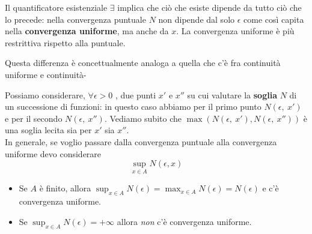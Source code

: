 Il quantificatore esistenziale $\exists$ implica che ciò che esiste dipende da tutto ciò che lo precede: nella convergenza puntuale $N$ non dipende dal solo $\epsilon$ come così capita nella \textbf{convergenza uniforme}, ma anche da $x$. La convergenza uniforme è più restrittiva rispetto alla puntuale.
\begin{observe}
	Questa differenza è concettualmente analoga a quella che c'è fra continuità uniforme e continuità-
\end{observe}
\begin{observe}
	Possiamo considerare, $\forall \epsilon >0$ , due punti $x'$ e $x''$ su cui valutare la \textbf{soglia} $N$ di un successione di funzioni: in questo caso abbiamo per il primo punto $N\left(\epsilon,\ x'\right)$ e per il secondo $N\left(\epsilon,\ x''\right)$. Vediamo subito che $\max\left(N\left(\epsilon,\ x'\right),N\left(\epsilon,\ x''\right)\right)$ è una soglia lecita sia per $x'$ sia $x''$.\\
	In generale, se voglio passare dalla convergenza puntuale alla convergenza uniforme devo considerare
	\begin{equation*}
		\sup_{x\in A}N\left(\epsilon, x\right)
	\end{equation*}
\begin{itemize}
	\item Se $A$ è finito, allora $\displaystyle\sup_{x\in A}N\left(\epsilon\right)=\max_{x\in A}N\left(\epsilon\right)=N\left(\epsilon\right)$ e c'è convergenza uniforme.
	\item Se $\displaystyle\sup_{x\in A}N\left(\epsilon\right)=+\infty$ allora \textit{non} c'è convergenza uniforme.
\end{itemize}
\end{observe}